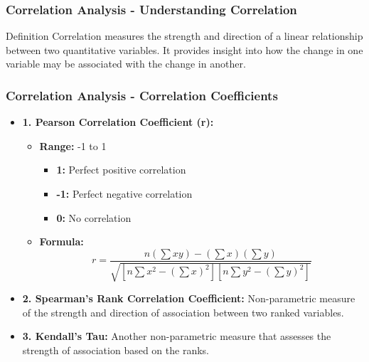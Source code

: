 \documentclass[aspectratio=169]{beamer}
\begin{document}
\begin{frame}[fragile]
    \frametitle{Correlation Analysis - Understanding Correlation}
    \begin{block}{Definition}
        Correlation measures the strength and direction of a linear relationship between two quantitative variables. It provides insight into how the change in one variable may be associated with the change in another.
    \end{block}
\end{frame}

\begin{frame}[fragile]
    \frametitle{Correlation Analysis - Correlation Coefficients}
    \begin{itemize}
        \item \textbf{1. Pearson Correlation Coefficient (r):}
        \begin{itemize}
            \item \textbf{Range:} -1 to 1 
                \begin{itemize}
                    \item \textbf{1:} Perfect positive correlation
                    \item \textbf{-1:} Perfect negative correlation
                    \item \textbf{0:} No correlation
                \end{itemize}
            \item \textbf{Formula:}
            \begin{equation}
                r = \frac{n(\sum xy) - (\sum x)(\sum y)}{\sqrt{[n\sum x^2 - (\sum x)^2][n\sum y^2 - (\sum y)^2]}}
            \end{equation}
        \end{itemize}
        
        \item \textbf{2. Spearman's Rank Correlation Coefficient:} Non-parametric measure of the strength and direction of association between two ranked variables.
        
        \item \textbf{3. Kendall’s Tau:} Another non-parametric measure that assesses the strength of association based on the ranks.
    \end{itemize}
\end{frame}
\end{document}
